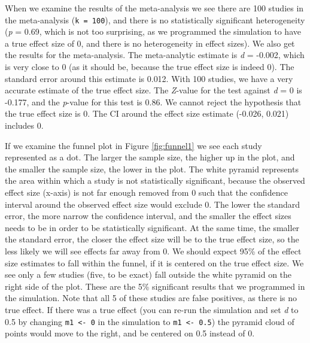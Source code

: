 \documentclass[
  oneside]{krantz}
\begin{document}
When we examine the results of the meta-analysis we see there are 100 studies in the meta-analysis (\texttt{k\ =\ 100}), and there is no statistically significant heterogeneity (\emph{p} = 0.69, which is not too surprising, as we programmed the simulation to have a true effect size of 0, and there is no heterogeneity in effect sizes). We also get the results for the meta-analysis. The meta-analytic estimate is \emph{d} = -0.002, which is very close to 0 (as it should be, because the true effect size is indeed 0). The standard error around this estimate is 0.012. With 100 studies, we have a very accurate estimate of the true effect size. The \emph{Z}-value for the test against \emph{d} = 0 is -0.177, and the \emph{p}-value for this test is 0.86. We cannot reject the hypothesis that the true effect size is 0. The CI around the effect size estimate (-0.026, 0.021) includes 0.

If we examine the funnel plot in Figure \ref{fig:funnel1} we see each study represented as a dot. The larger the sample size, the higher up in the plot, and the smaller the sample size, the lower in the plot. The white pyramid represents the area within which a study is not statistically significant, because the observed effect size (x-axis) is not far enough removed from 0 such that the confidence interval around the observed effect size would exclude 0. The lower the standard error, the more narrow the confidence interval, and the smaller the effect sizes needs to be in order to be statistically significant. At the same time, the smaller the standard error, the closer the effect size will be to the true effect size, so the less likely we will see effects far away from 0. We should expect 95\% of the effect size estimates to fall within the funnel, if it is centered on the true effect size. We see only a few studies (five, to be exact) fall outside the white pyramid on the right side of the plot. These are the 5\% significant results that we programmed in the simulation. Note that all 5 of these studies are false positives, as there is no true effect. If there was a true effect (you can re-run the simulation and set \emph{d} to 0.5 by changing \texttt{m1\ \textless{}-\ 0} in the simulation to \texttt{m1\ \textless{}-\ 0.5}) the pyramid cloud of points would move to the right, and be centered on 0.5 instead of 0.
\end{document}
